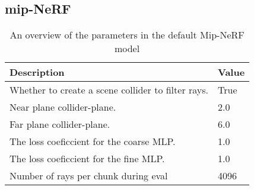 \subsection{mip-NeRF}
\begin{table}[H]
    \centering
    \begin{tabular}{|l|l|}
    \hline
    \textbf{Description} & \textbf{Value} \\ 
    \hline
    Whether to create a scene collider to filter rays.  & True \\
    Near plane collider-plane.                          & 2.0 \\
    Far plane collider-plane.                           & 6.0 \\
    The loss coeficcient for the coarse MLP.            & 1.0 \\
    The loss coeficcient for the fine MLP.              & 1.0 \\
    Number of rays per chunk during eval                & 4096 \\
    \hline
    \end{tabular}
    \caption{An overview of the parameters in the default Mip-NeRF model}
    \label{tab:mip-nerf-parameter-overview}
\end{table}


\begin{comment}
    
Additional material that does not fit in the main thesis but may still be relevant to share, e.g., raw data from experiments and surveys, code listings, additional plots, pre-project reports, project agreements, contracts, logs etc., can be put in appendices. Simply issue the command \texttt{\textbackslash appendix} in the main \texttt{.tex} file, and make one chapter per appendix.

If the appendix is in the form of a ready-made PDF file, it should be supported by a small descriptive text, and included using the \texttt{pdfpages} package. To illustrate how it works, a standard project agreement (for the IE faculty at NTNU in Gjøvik) is attached here. You would probably want the included PDF file to begin on an odd (right hand) page, which is achieved by using the \texttt{\textbackslash cleardoublepage} command immediately before the \texttt{\textbackslash includepdf[]\{\}} command. Use the option \texttt{[pages=-]} to include all pages of the PDF document, or, e.g., \texttt{[pages=2-4]} to include only the given page range.

\cleardoublepage

\end{comment}







